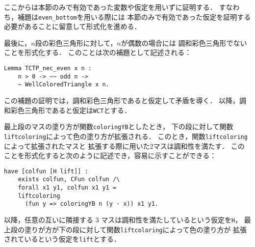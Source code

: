 
ここからは本節のみで有効であった変数や仮定を用いずに証明する．
すなわち，補題は{\tt{even\_bottom}}を用いる際には
本節のみで有効であった仮定を証明する必要があることに留意して形式化を進める．

最後に，$n$段の彩色三角形に対して，$n$が偶数の場合には
調和彩色三角形でないことを形式化する．
このことは次の補題として記述される：
\begin{lstlisting}[language=Coq]
  Lemma TCTP_nec_even x n :
    n > 0 -> ~~ odd n ->
    ~ WellColoredTriangle x n.
\end{lstlisting}
この補題の証明では，調和彩色三角形であると仮定して矛盾を導く．
以降，調和彩色三角形であると仮定は{\tt{WCT}}とする．

最上段のマスの塗り方が関数{\tt{coloringYB}}としたとき，
下の段に対して関数{\tt{liftcoloring}}によって色の塗り方が拡張される．
このとき，関数{\tt{liftcoloring}}によって拡張されたマスと
拡張する際に用いた2マスは調和性を満たす．
このことを形式化すると次のように記述でき，容易に示すことができる：
\begin{lstlisting}[language=Coq]
  have [colfun [H lift]] :
    exists colfun, CFun colfun /\
    forall x1 y1, colfun x1 y1 =
    liftcoloring
      (fun y => coloringYB n (y - x)) x1 y1.
\end{lstlisting}
以降，任意の互いに隣接する 3 マスは調和性を満たしているという仮定を{\tt{H}}，
最上段の塗りが方が下の段に対して関数{\tt{liftcoloring}}によって色の塗り方が
拡張されているという仮定を{\tt{lift}}とする．

